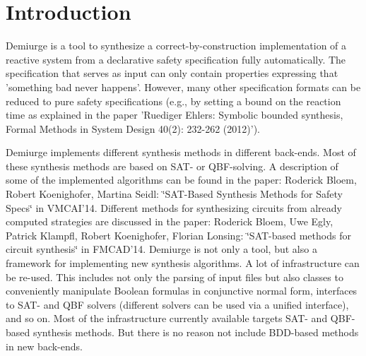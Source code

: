\hypertarget{index_intro_sec}{}\section{Introduction}\label{index_intro_sec}
Demiurge is a tool to synthesize a correct-\/by-\/construction implementation of a reactive system from a declarative safety specification fully automatically. The specification that serves as input can only contain properties expressing that 'something bad never happens'. However, many other specification formats can be reduced to pure safety specifications (e.\-g., by setting a bound on the reaction time as explained in the paper 'Ruediger Ehlers\-: Symbolic bounded synthesis, Formal Methods in System Design 40(2)\-: 232-\/262 (2012)').

Demiurge implements different synthesis methods in different back-\/ends. Most of these synthesis methods are based on S\-A\-T-\/ or Q\-B\-F-\/solving. A description of some of the implemented algorithms can be found in the paper\-: Roderick Bloem, Robert Koenighofer, Martina Seidl\-: \char`\"{}\-S\-A\-T-\/\-Based Synthesis 
  Methods for Safety Specs\char`\"{} in V\-M\-C\-A\-I'14. Different methods for synthesizing circuits from already computed strategies are discussed in the paper\-: Roderick Bloem, Uwe Egly, Patrick Klampfl, Robert Koenighofer, Florian Lonsing\-: \char`\"{}\-S\-A\-T-\/based methods for circuit synthesis\char`\"{} in F\-M\-C\-A\-D'14. Demiurge is not only a tool, but also a framework for implementing new synthesis algorithms. A lot of infrastructure can be re-\/used. This includes not only the parsing of input files but also classes to conveniently manipulate Boolean formulas in conjunctive normal form, interfaces to S\-A\-T-\/ and Q\-B\-F solvers (different solvers can be used via a unified interface), and so on. Most of the infrastructure currently available targets S\-A\-T-\/ and Q\-B\-F-\/based synthesis methods. But there is no reason not include B\-D\-D-\/based methods in new back-\/ends.

